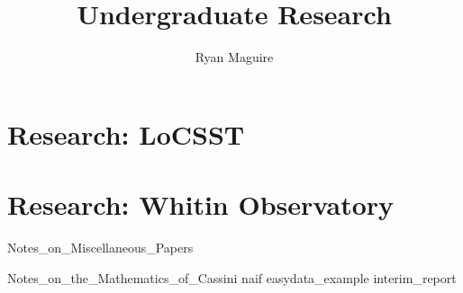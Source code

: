 \documentclass[crop=false,class=book,oneside]{standalone}
\begin{document}
    \newif\ifresearch
    \ifstandalone
        \title{Undergraduate Research}
        \author{Ryan Maguire}
        \date{\vspace{-5ex}}
        \maketitle
        \tableofcontents
        \listoffigures
        \listoftables
        \clearpage
    \fi
    \part{Research: LoCSST}
    \part{Research: Whitin Observatory}
        
                  {Notes_on_Miscellaneous_Papers}
        
                  {Notes_on_the_Mathematics_of_Cassini}
    {naif}
    {easydata_example}
    {interim_report}
\end{document}
